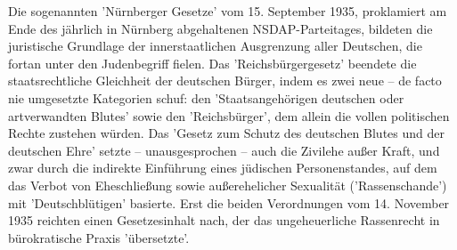 \documentclass[letterpaper, 12pt]{article}
\begin{document}
Die sogenannten 'Nürnberger Gesetze' vom 15. September 1935, proklamiert am Ende des jährlich in Nürnberg abgehaltenen NSDAP-Parteitages, bildeten die juristische Grundlage der innerstaatlichen Ausgrenzung aller Deutschen, die fortan unter den Judenbegriff fielen. Das 'Reichsbürgergesetz' beendete die staatsrechtliche Gleichheit der deutschen Bürger, indem es zwei neue – de facto nie umgesetzte Kategorien schuf: den 'Staatsangehörigen deutschen oder artverwandten Blutes' sowie den 'Reichsbürger', dem allein die vollen politischen Rechte zustehen würden. Das 'Gesetz zum Schutz des deutschen Blutes und der deutschen Ehre' setzte – unausgesprochen – auch die Zivilehe außer Kraft, und zwar durch die indirekte Einführung eines jüdischen Personenstandes, auf dem das Verbot von Eheschließung sowie außerehelicher Sexualität ('Rassenschande') mit 'Deutschblütigen' basierte. Erst die beiden Verordnungen vom 14. November 1935 reichten einen Gesetzesinhalt nach, der das ungeheuerliche Rassenrecht in bürokratische Praxis 'übersetzte'.

\clearpage


\listoffigures
\end{document}

